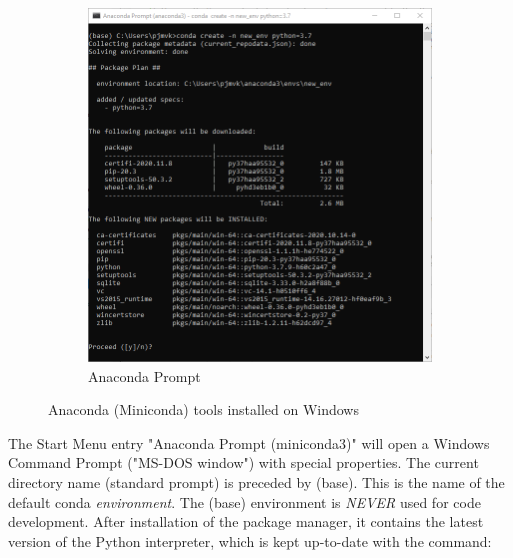 \begin{figure}[H]
\begin{subfigure}[b]{0.52\textwidth}
		\includegraphics[width=\textwidth]{Figures/AnacondaCommandWindow.png}
		\caption{Anaconda Prompt}
		\label{AnacondaPrompt}
	\end{subfigure}
	\caption{Anaconda (Miniconda) tools installed on Windows}
	\label{AnacondaTools}
\end{figure}

The Start Menu entry "\textsf{Anaconda Prompt (miniconda3)}" will open a Windows Command Prompt ("MS-DOS window") with special properties. The current directory name (standard prompt) is preceded by \textsf{(base)}. This is the name of the default \textsf{conda} \emph{environment}.
The \textsf{(base)} environment is \emph{NEVER} used for code development. After installation of the package manager, it contains the latest version of the Python interpreter, which is kept up-to-date with the command:

